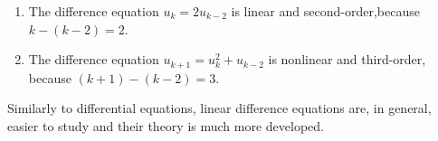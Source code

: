 \begin{example}
\begin{enumerate}
	\item The difference equation $u_{k} = 2 u_{k-2}$ is linear and second-order,because $k-(k-2) = 2$.
	\item The difference equation $u_{k+1} =  u_{k}^2+u_{k-2}$ is nonlinear and third-order, because $(k+1)-(k-2) = 3$.
\end{enumerate}	
\end{example}



Similarly to differential equations, linear difference equations are, in general, easier to study and their theory is much more developed.


